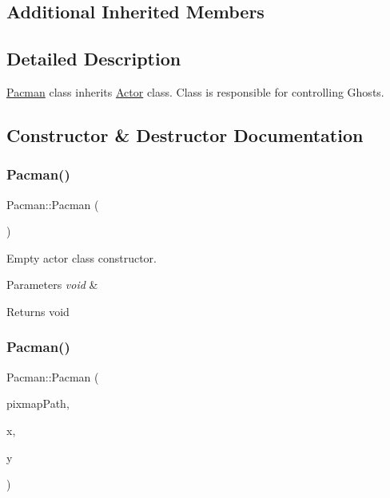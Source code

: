 \subsection*{Additional Inherited Members}


\subsection{Detailed Description}
\mbox{\hyperlink{class_pacman}{Pacman}} class inherits \mbox{\hyperlink{class_actor}{Actor}} class. Class is responsible for controlling Ghosts. 

\subsection{Constructor \& Destructor Documentation}
\mbox{\label{class_pacman_a499408baab38f119ebd4f41e90fbe3fe}} 
\subsubsection{\texorpdfstring{Pacman()}{Pacman()}\hspace{0.1cm}{\footnotesize\ttfamily [1/2]}}
{\footnotesize\ttfamily Pacman\+::\+Pacman (\begin{DoxyParamCaption}{ }\end{DoxyParamCaption})}



Empty actor class constructor. 


\begin{DoxyParams}{Parameters}
{\em void} & \\
\hline
\end{DoxyParams}
\begin{DoxyReturn}{Returns}
void 
\end{DoxyReturn}
\mbox{\label{class_pacman_af7a106cbda2c19a855f87dcbac2bfcf5}} 
\subsubsection{\texorpdfstring{Pacman()}{Pacman()}\hspace{0.1cm}{\footnotesize\ttfamily [2/2]}}
{\footnotesize\ttfamily Pacman\+::\+Pacman (\begin{DoxyParamCaption}\item[{Q\+String}]{pixmap\+Path,  }\item[{int}]{x,  }\item[{int}]{y }\end{DoxyParamCaption})}



